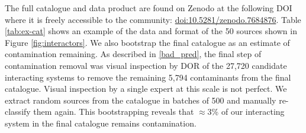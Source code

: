 {The full catalogue and data product are found on Zenodo at the following DOI where it is freely accessible to the community: \href{https://doi.org/10.5281/zenodo.7684876}{doi:10.5281/zenodo.7684876}. Table \ref{tab:ex-cat} shows an example of the data and format of the 50 sources shown in Figure \ref{fig:interactors}. We also bootstrap the final catalogue as an estimate of contamination remaining. As described in \DIFdelbegin {}\DIFdelend \DIFaddbegin {}\DIFaddend \ref{bad_pred}, the final step of contamination removal was visual inspection by DOR of the 27,720 candidate interacting systems to remove the remaining 5,794 contaminants from the final catalogue. Visual inspection by a single expert at this scale is not perfect. We extract random sources from the catalogue in batches of 500 and manually re-classify them again. This bootstrapping reveals that $\approx$3\% of our interacting system in the final catalogue remains contamination.

}
